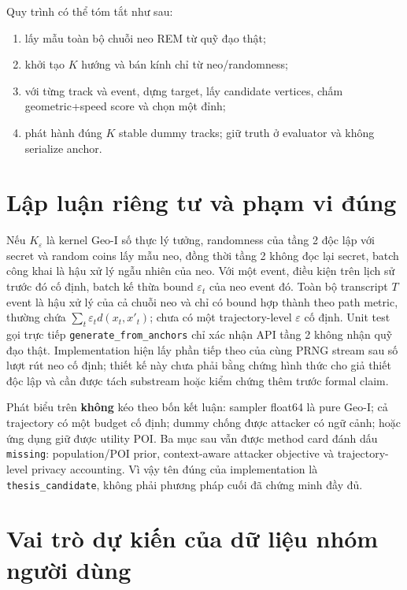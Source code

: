 \documentclass[12pt,a4paper,oneside]{report}
\begin{document}
Quy trình có thể tóm tắt như sau:

\begin{enumerate}
  \item lấy mẫu toàn bộ chuỗi neo REM từ quỹ đạo thật;
  \item khởi tạo $K$ hướng và bán kính chỉ từ neo/randomness;
  \item với từng track và event, dựng target, lấy candidate vertices, chấm geometric+speed score và chọn một đỉnh;
  \item phát hành đúng $K$ stable dummy tracks; giữ truth ở evaluator và không serialize anchor.
\end{enumerate}

\section{Lập luận riêng tư và phạm vi đúng}

Nếu $K_{\varepsilon}$ là kernel Geo-I số thực lý tưởng, randomness của tầng 2 độc lập với secret và random coins lấy mẫu neo, đồng thời tầng 2 không đọc lại secret, batch công khai là hậu xử lý ngẫu nhiên của neo. Với một event, điều kiện trên lịch sử trước đó cố định, batch kế thừa bound $\varepsilon_t$ của neo event đó. Toàn bộ transcript $T$ event là hậu xử lý của cả chuỗi neo và chỉ có bound hợp thành theo path metric, thường chứa $\sum_t\varepsilon_t d(x_t,x'_t)$; chưa có một trajectory-level $\varepsilon$ cố định. Unit test gọi trực tiếp \texttt{generate\_from\_anchors} chỉ xác nhận API tầng 2 không nhận quỹ đạo thật. Implementation hiện lấy phần tiếp theo của cùng PRNG stream sau số lượt rút neo cố định; thiết kế này chưa phải bằng chứng hình thức cho giả thiết độc lập và cần được tách substream hoặc kiểm chứng thêm trước formal claim.

Phát biểu trên \textbf{không} kéo theo bốn kết luận: sampler float64 là pure Geo-I; cả trajectory có một budget cố định; dummy chống được attacker có ngữ cảnh; hoặc ứng dụng giữ được utility POI. Ba mục sau vẫn được method card đánh dấu \texttt{missing}: population/POI prior, context-aware attacker objective và trajectory-level privacy accounting. Vì vậy tên đúng của implementation là \texttt{thesis\_candidate}, không phải phương pháp cuối đã chứng minh đầy đủ.

\section{Vai trò dự kiến của dữ liệu nhóm người dùng}
\end{document}
